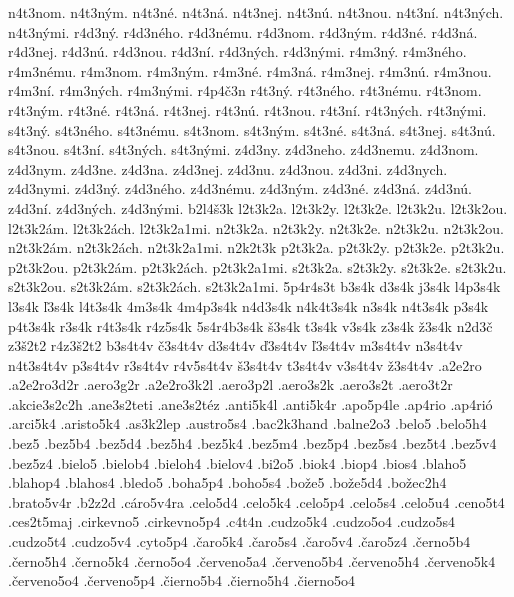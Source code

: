 {n4t3nom.
n4t3n\'ym.
n4t3n\'e.
n4t3n\'a.
n4t3nej.
n4t3n\'u.
n4t3nou.
n4t3n\'i.
n4t3n\'ych.
n4t3n\'ymi.
r4d3n\'y.
r4d3n\'eho.
r4d3n\'emu.
r4d3nom.
r4d3n\'ym.
r4d3n\'e.
r4d3n\'a.
r4d3nej.
r4d3n\'u.
r4d3nou.
r4d3n\'i.
r4d3n\'ych.
r4d3n\'ymi.
r4m3n\'y.
r4m3n\'eho.
r4m3n\'emu.
r4m3nom.
r4m3n\'ym.
r4m3n\'e.
r4m3n\'a.
r4m3nej.
r4m3n\'u.
r4m3nou.
r4m3n\'i.
r4m3n\'ych.
r4m3n\'ymi.
r4p4\v c3n
r4t3n\'y.
r4t3n\'eho.
r4t3n\'emu.
r4t3nom.
r4t3n\'ym.
r4t3n\'e.
r4t3n\'a.
r4t3nej.
r4t3n\'u.
r4t3nou.
r4t3n\'i.
r4t3n\'ych.
r4t3n\'ymi.
s4t3n\'y.
s4t3n\'eho.
s4t3n\'emu.
s4t3nom.
s4t3n\'ym.
s4t3n\'e.
s4t3n\'a.
s4t3nej.
s4t3n\'u.
s4t3nou.
s4t3n\'i.
s4t3n\'ych.
s4t3n\'ymi.
z4d3ny.
z4d3neho.
z4d3nemu.
z4d3nom.
z4d3nym.
z4d3ne.
z4d3na.
z4d3nej.
z4d3nu.
z4d3nou.
z4d3ni.
z4d3nych.
z4d3nymi.
z4d3n\'y.
z4d3n\'eho.
z4d3n\'emu.
z4d3n\'ym.
z4d3n\'e.
z4d3n\'a.
z4d3n\'u.
z4d3n\'i.
z4d3n\'ych.
z4d3n\'ymi.
b2l4\v s3k
l2t3k2a.
l2t3k2y.
l2t3k2e.
l2t3k2u.
l2t3k2ou.
l2t3k2\'am.
l2t3k2\'ach.
l2t3k2a1mi.
n2t3k2a.
n2t3k2y.
n2t3k2e.
n2t3k2u.
n2t3k2ou.
n2t3k2\'am.
n2t3k2\'ach.
n2t3k2a1mi.
n2k2t3k
p2t3k2a.
p2t3k2y.
p2t3k2e.
p2t3k2u.
p2t3k2ou.
p2t3k2\'am.
p2t3k2\'ach.
p2t3k2a1mi.
s2t3k2a.
s2t3k2y.
s2t3k2e.
s2t3k2u.
s2t3k2ou.
s2t3k2\'am.
s2t3k2\'ach.
s2t3k2a1mi.
5p4r4s3t
b3s4k
d3s4k
j3s4k
l4p3s4k
l3s4k
\v l3s4k
l4t3s4k
4m3s4k
4m4p3s4k
n4d3s4k
n4k4t3s4k
n3s4k
n4t3s4k
p3s4k
p4t3s4k
r3s4k
r4t3s4k
r4z5s4k
5s4r4b3s4k
\v s3s4k
t3s4k
v3s4k
z3s4k
\v z3s4k
n2d3\v c
z3\v s2t2
r4z3\v s2t2
b3s4t4v
\v c3s4t4v
d3s4t4v
\v d3s4t4v
\v l3s4t4v
m3s4t4v
n3s4t4v
n4t3s4t4v
p3s4t4v
r3s4t4v
r4v5s4t4v
\v s3s4t4v
t3s4t4v
v3s4t4v
\v z3s4t4v
.a2e2ro
.a2e2ro3d2r
.aero3g2r
.a2e2ro3k2l
.aero3p2l
.aero3s2k
.aero3s2t
.aero3t2r
.akcie3s2c2h
.ane3s2teti
.ane3s2t\'ez
.anti5k4l
.anti5k4r
.apo5p4le
.ap4rio
.ap4ri\'o
.arci5k4
.aristo5k4
.as3k2lep
.austro5s4
.bac2k3hand
.balne2o3
.belo5
.belo5h4
.bez5
.bez5b4
.bez5d4
.bez5h4
.bez5k4
.bez5m4
.bez5p4
.bez5s4
.bez5t4
.bez5v4
.bez5z4
.bielo5
.bielob4
.bieloh4
.bielov4
.bi2o5
.biok4
.biop4
.bios4
.blaho5
.blahop4
.blahos4
.bledo5
.boha5p4
.boho5s4
.bo\v ze5
.bo\v ze5d4
.bo\v zec2h4
.brato5v4r
.b2z2d
.c\'aro5v4ra
.celo5d4
.celo5k4
.celo5p4
.celo5s4
.celo5u4
.ceno5t4
.ces2t5maj
.cirkevno5
.cirkevno5p4
.c4t4n
.cudzo5k4
.cudzo5o4
.cudzo5s4
.cudzo5t4
.cudzo5v4
.cyto5p4
.\v caro5k4
.\v caro5s4
.\v caro5v4
.\v caro5z4
.\v cerno5b4
.\v cerno5h4
.\v cerno5k4
.\v cerno5o4
.\v cerveno5a4
.\v cerveno5b4
.\v cerveno5h4
.\v cerveno5k4
.\v cerveno5o4
.\v cerveno5p4
.\v cierno5b4
.\v cierno5h4
.\v cierno5o4
}
